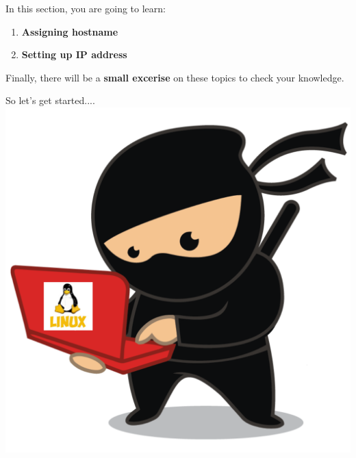 \setlength{\columnsep}{3pt}
\begin{flushleft}
	\bigskip
	\bigskip
	\begin{tcolorbox}[breakable,notitle,boxrule=1pt,colback=black,colframe=black]
		\color{white}
		\bigskip
		In this section, you are going to learn:
		\begin{enumerate}
			\item \textbf{Assigning hostname}
			\item \textbf{Setting up IP address}
		\end{enumerate}	
		\bigskip
		Finally, there will be a \textbf{small excerise} on these topics to check your knowledge.
		\bigskip
	\end{tcolorbox}
	
	
	\begin{multicols}{2}
		\vspace*{\fill}
		\vspace*{\fill}
		\vspace*{\fill}
		\vspace*{\fill}
		\vspace*{\fill}
		\vspace*{\fill}
		\vspace*{\fill}
		\vspace*{\fill}
		\vspace*{\fill}
		
		\vfill \null
		\columnbreak
		So let's get started....
		\includegraphics[scale=0.08]{content/linux_section.png}
	\end{multicols}	
	
\end{flushleft}

\newpage

